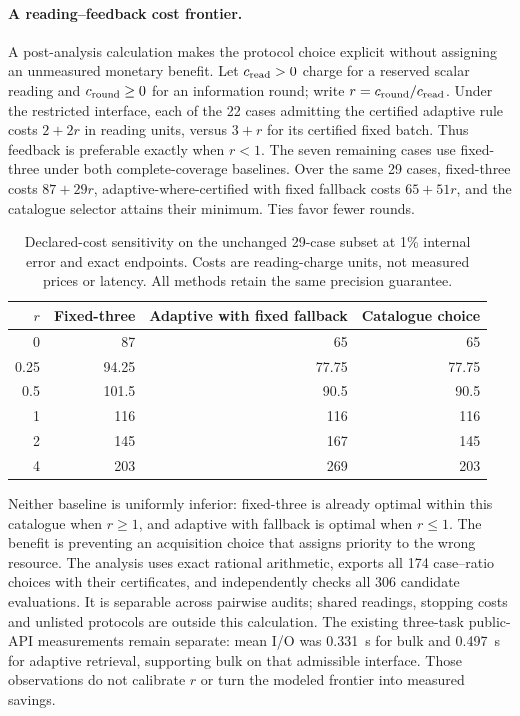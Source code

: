 \paragraph{A reading--feedback cost frontier.}
A post-analysis calculation makes the protocol choice explicit without
assigning an unmeasured monetary benefit. Let $c_{\rm read}>0$ charge for a
reserved scalar reading and $c_{\rm round}\geq0$ for an information round;
write $r=c_{\rm round}/c_{\rm read}$. Under the restricted interface, each of
the 22 cases admitting the certified adaptive rule costs $2+2r$ in reading
units, versus $3+r$ for its certified fixed batch. Thus feedback is preferable
exactly when $r<1$. The seven remaining cases use fixed-three under both
complete-coverage baselines. Over the same 29 cases, fixed-three costs
$87+29r$, adaptive-where-certified with fixed fallback costs $65+51r$, and
the catalogue selector attains their minimum. Ties favor fewer rounds.

\begin{table}[htbp]\centering\small
\caption{Declared-cost sensitivity on the unchanged 29-case subset at 1\%
internal error and exact endpoints. Costs are reading-charge units, not
measured prices or latency. All methods retain the same precision guarantee.}
\label{tab:protocol-cost-frontier}
\begin{tabular}{rrrr}\hline
$r$ & Fixed-three & Adaptive with fixed fallback & Catalogue choice\\\hline
0 & 87 & 65 & 65\\
0.25 & 94.25 & 77.75 & 77.75\\
0.5 & 101.5 & 90.5 & 90.5\\
1 & 116 & 116 & 116\\
2 & 145 & 167 & 145\\
4 & 203 & 269 & 203\\\hline
\end{tabular}\end{table}

Neither baseline is uniformly inferior: fixed-three is already optimal
within this catalogue when $r\geq1$, and adaptive with fallback is optimal
when $r\leq1$. The benefit is preventing an acquisition choice that assigns
priority to the wrong resource. The analysis uses exact rational arithmetic,
exports all 174 case--ratio choices with their certificates, and independently
checks all 306 candidate evaluations. It is separable across pairwise audits;
shared readings, stopping costs and unlisted protocols are outside this
calculation. The existing three-task public-API measurements remain separate:
mean I/O was 0.331~s for bulk and 0.497~s for adaptive retrieval, supporting
bulk on that admissible interface. Those observations do not calibrate $r$
or turn the modeled frontier into measured savings.
